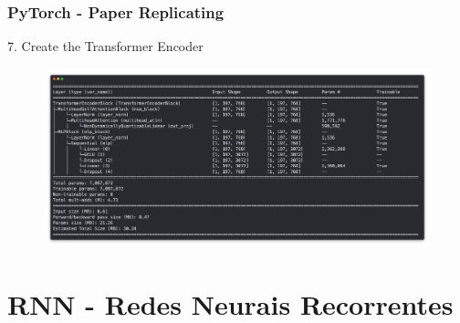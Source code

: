 \documentclass{beamer}
\begin{document}
\begin{frame}
	\frametitle{PyTorch - Paper Replicating}
	\begin{block}{7. Create the Transformer Encoder}
		\begin{figure}
			\centering
			\includegraphics[width=1\linewidth]{figures/final_model}
		\end{figure}
		
		
	\end{block}
\end{frame}
\section{RNN - Redes Neurais Recorrentes}
\end{document}
